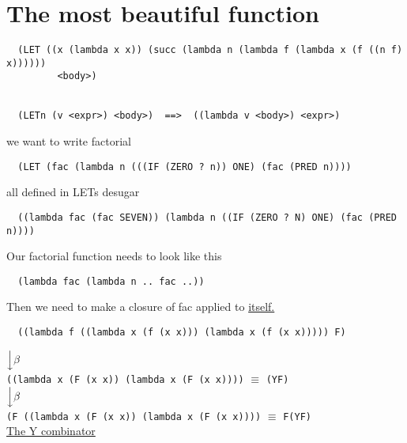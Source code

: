 \documentclass{article}
\begin{document}
\section*{The most beautiful function}
\begin{flushleft}
 \begin{verbatim}
  (LET ((x (lambda x x)) (succ (lambda n (lambda f (lambda x (f ((n f) x))))))
         <body>)
         
         
  (LETn (v <expr>) <body>)  ==>  ((lambda v <body>) <expr>)
 \end{verbatim}
 we want to write factorial\\
 \begin{verbatim}
  (LET (fac (lambda n (((IF (ZERO ? n)) ONE) (fac (PRED n))))
 \end{verbatim}
 all defined in LETs desugar
 \begin{verbatim}
  ((lambda fac (fac SEVEN)) (lambda n ((IF (ZERO ? N) ONE) (fac (PRED n))))
 \end{verbatim}
 Our factorial function needs to look like this
 \begin{verbatim}
  (lambda fac (lambda n .. fac ..))
 \end{verbatim}
 Then we need to make a closure of fac applied to \underline{itself.}
 \begin{verbatim}
  ((lambda f ((lambda x (f (x x))) (lambda x (f (x x))))) F)
 \end{verbatim}
 $\Big\downarrow{\beta}$\\
 \bigskip
 \verb|((lambda x (F (x x)) (lambda x (F (x x))))| $\equiv$ \verb|(YF)|\\
 \bigskip
 $\Big\downarrow{\beta}$\\
 \bigskip
 \verb|(F ((lambda x (F (x x)) (lambda x (F (x x))))| $\equiv$ \verb|F(YF)|\\
 \bigskip
 \underline{The Y combinator}
\end{flushleft}
\end{document}
